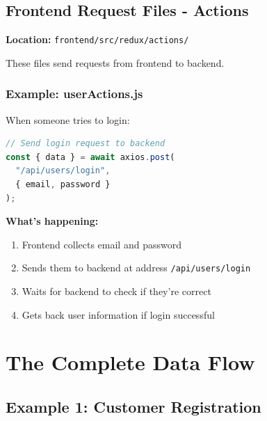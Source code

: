 \documentclass[12pt]{article}
\begin{document}
\subsection{Frontend Request Files - Actions}

\textbf{Location:} \texttt{frontend/src/redux/actions/}

These files send requests from frontend to backend.

\subsubsection{Example: userActions.js}

When someone tries to login:

\begin{lstlisting}[language=JavaScript]
// Send login request to backend
const { data } = await axios.post(
  "/api/users/login",
  { email, password }
);
\end{lstlisting}

\textbf{What's happening:}
\begin{enumerate}
    \item Frontend collects email and password
    \item Sends them to backend at address \texttt{/api/users/login}
    \item Waits for backend to check if they're correct
    \item Gets back user information if login successful
\end{enumerate}

\section{The Complete Data Flow}

\subsection{Example 1: Customer Registration}
\end{document}
